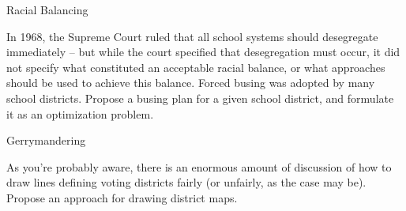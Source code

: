\documentclass{tufte-handout}
\begin{document}

\item Racial Balancing

In 1968, the Supreme Court ruled that all school systems should desegregate immediately -- but while the court specified that desegregation must occur, it did not specify what constituted an acceptable racial balance, or what approaches should be used to achieve this balance.  Forced busing was adopted by many school districts.  Propose a  busing plan for a given school district, and formulate it as an optimization problem.

\item Gerrymandering

As you're probably aware, there is an enormous amount of discussion of how to draw lines defining voting districts fairly (or unfairly, as the case may be).  Propose an approach for drawing district maps.

\ee
\end{document}
